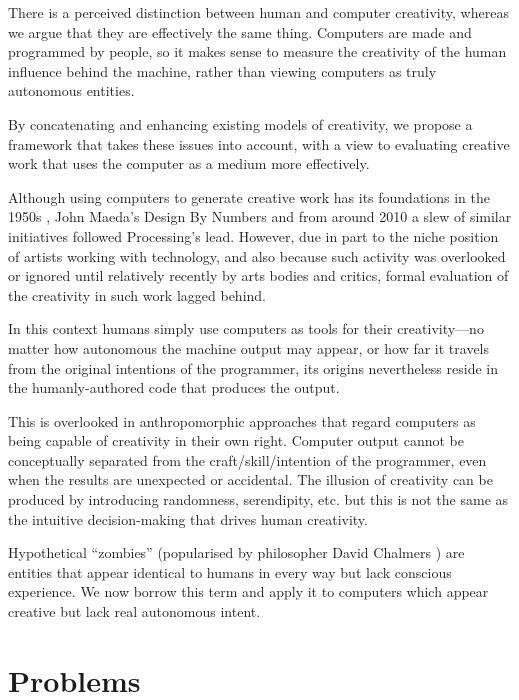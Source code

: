 There is a perceived distinction between human and computer creativity, whereas \colorbox{red!30}{we} argue that they are effectively the same thing. Computers are made and programmed by people, so it makes sense to measure the creativity of the human influence behind the machine, rather than viewing computers as truly autonomous entities.

By concatenating and enhancing existing models of creativity, \colorbox{red!30}{we} propose a framework that takes these issues into account, with a view to evaluating creative work that uses the computer as a medium more effectively.

\spirals

Although using computers to generate creative work has its foundations in the 1950s \autocite{Candy2011}, John Maeda's Design By Numbers \autocite{Maeda2001} and from around 2010 a slew of similar initiatives followed Processing's lead. However, due in part to the niche position of artists working with technology, and also because such activity was overlooked or ignored until relatively recently by arts bodies and critics, formal evaluation of the creativity in such work lagged behind.

In this context humans simply use computers as tools for their creativity---no matter how autonomous the machine output may appear, or how far it travels from the original intentions of the programmer, its origins nevertheless reside in the humanly-authored code that produces the output.

This is overlooked in anthropomorphic approaches that regard computers as being capable of creativity in their own right. Computer output cannot be conceptually separated from the craft/skill/intention of the programmer, even when the results are unexpected or accidental. The illusion of creativity can be produced by introducing randomness, serendipity, etc. but this is not the same as the intuitive decision-making that drives human creativity.

Hypothetical ``zombies'' (popularised by philosopher David Chalmers \autocite{Chalmers1996}) are entities that appear identical to humans in every way but lack conscious experience. \colorbox{red!30}{We} now borrow this term and apply it to computers which appear creative but lack real autonomous intent.



\section{Problems}


